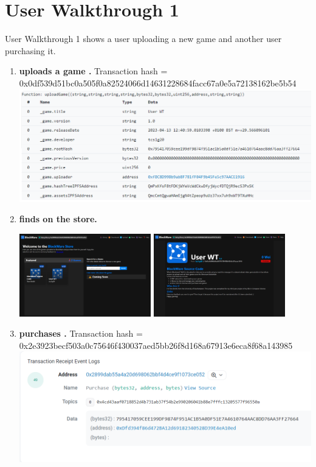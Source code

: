 
\section*{User Walkthrough 1}

User Walkthrough 1 shows a user  uploading a new game  and another user  purchasing it.
\begin{enumerate}[itemsep=2.5pt]
  \item \textbf{ uploads a game .}
  Transaction hash = 0x0df539d51bc0a505f0a82524066d14631228684facc67a0e5a72138162be5b54
  \includegraphics[width=\textwidth]{assets/images/user-walkthrough/1/upload.png}


  \item \textbf{ finds  on the store.}
  
  \includegraphics[width=0.45\textwidth]{assets/images/user-walkthrough/1/store.png}
  \includegraphics[width=0.45\textwidth]{assets/images/user-walkthrough/1/store-entry.png}
  
  \item \textbf{ purchases .}
  Transaction hash = 0x2e3923becf503a0c75646f430037aed5bb26f8d168a67913e6eca8f68a143985
  \includegraphics[width=\textwidth]{assets/images/user-walkthrough/1/purchase.png}
  

\end{enumerate}
